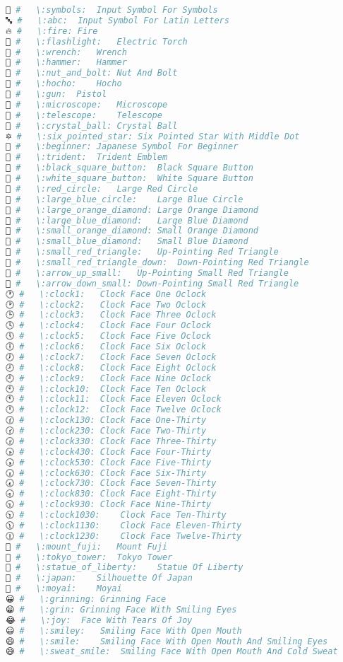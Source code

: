 \begin{lstlisting}[language=Julia, style=julia]
🔣 #   \:symbols:  Input Symbol For Symbols
🔤 #   \:abc:  Input Symbol For Latin Letters
🔥 #   \:fire: Fire
🔦 #   \:flashlight:   Electric Torch
🔧 #   \:wrench:   Wrench
🔨 #   \:hammer:   Hammer
🔩 #   \:nut_and_bolt: Nut And Bolt
🔪 #   \:hocho:    Hocho
🔫 #   \:gun:  Pistol
🔬 #   \:microscope:   Microscope
🔭 #   \:telescope:    Telescope
🔮 #   \:crystal_ball: Crystal Ball
🔯 #   \:six_pointed_star: Six Pointed Star With Middle Dot
🔰 #   \:beginner: Japanese Symbol For Beginner
🔱 #   \:trident:  Trident Emblem
🔲 #   \:black_square_button:  Black Square Button
🔳 #   \:white_square_button:  White Square Button
🔴 #   \:red_circle:   Large Red Circle
🔵 #   \:large_blue_circle:    Large Blue Circle
🔶 #   \:large_orange_diamond: Large Orange Diamond
🔷 #   \:large_blue_diamond:   Large Blue Diamond
🔸 #   \:small_orange_diamond: Small Orange Diamond
🔹 #   \:small_blue_diamond:   Small Blue Diamond
🔺 #   \:small_red_triangle:   Up-Pointing Red Triangle
🔻 #   \:small_red_triangle_down:  Down-Pointing Red Triangle
🔼 #   \:arrow_up_small:   Up-Pointing Small Red Triangle
🔽 #   \:arrow_down_small: Down-Pointing Small Red Triangle
🕐 #   \:clock1:   Clock Face One Oclock
🕑 #   \:clock2:   Clock Face Two Oclock
🕒 #   \:clock3:   Clock Face Three Oclock
🕓 #   \:clock4:   Clock Face Four Oclock
🕔 #   \:clock5:   Clock Face Five Oclock
🕕 #   \:clock6:   Clock Face Six Oclock
🕖 #   \:clock7:   Clock Face Seven Oclock
🕗 #   \:clock8:   Clock Face Eight Oclock
🕘 #   \:clock9:   Clock Face Nine Oclock
🕙 #   \:clock10:  Clock Face Ten Oclock
🕚 #   \:clock11:  Clock Face Eleven Oclock
🕛 #   \:clock12:  Clock Face Twelve Oclock
🕜 #   \:clock130: Clock Face One-Thirty
🕝 #   \:clock230: Clock Face Two-Thirty
🕞 #   \:clock330: Clock Face Three-Thirty
🕟 #   \:clock430: Clock Face Four-Thirty
🕠 #   \:clock530: Clock Face Five-Thirty
🕡 #   \:clock630: Clock Face Six-Thirty
🕢 #   \:clock730: Clock Face Seven-Thirty
🕣 #   \:clock830: Clock Face Eight-Thirty
🕤 #   \:clock930: Clock Face Nine-Thirty
🕥 #   \:clock1030:    Clock Face Ten-Thirty
🕦 #   \:clock1130:    Clock Face Eleven-Thirty
🕧 #   \:clock1230:    Clock Face Twelve-Thirty
🗻 #   \:mount_fuji:   Mount Fuji
🗼 #   \:tokyo_tower:  Tokyo Tower
🗽 #   \:statue_of_liberty:    Statue Of Liberty
🗾 #   \:japan:    Silhouette Of Japan
🗿 #   \:moyai:    Moyai
😀 #   \:grinning: Grinning Face
😁 #   \:grin: Grinning Face With Smiling Eyes
😂 #   \:joy:  Face With Tears Of Joy
😃 #   \:smiley:   Smiling Face With Open Mouth
😄 #   \:smile:    Smiling Face With Open Mouth And Smiling Eyes
😅 #   \:sweat_smile:  Smiling Face With Open Mouth And Cold Sweat

\end{lstlisting}
